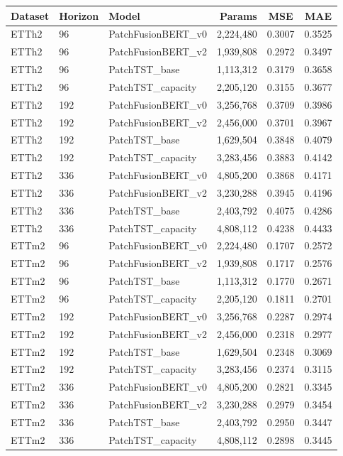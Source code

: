 \begin{tabular}{lllrcc}
\toprule
Dataset & Horizon & Model & Params & MSE & MAE \\
\midrule
ETTh2 & 96 & PatchFusionBERT_v0 & 2,224,480 & 0.3007 & 0.3525 \\
ETTh2 & 96 & PatchFusionBERT_v2 & 1,939,808 & 0.2972 & 0.3497 \\
ETTh2 & 96 & PatchTST_base & 1,113,312 & 0.3179 & 0.3658 \\
ETTh2 & 96 & PatchTST_capacity & 2,205,120 & 0.3155 & 0.3677 \\
ETTh2 & 192 & PatchFusionBERT_v0 & 3,256,768 & 0.3709 & 0.3986 \\
ETTh2 & 192 & PatchFusionBERT_v2 & 2,456,000 & 0.3701 & 0.3967 \\
ETTh2 & 192 & PatchTST_base & 1,629,504 & 0.3848 & 0.4079 \\
ETTh2 & 192 & PatchTST_capacity & 3,283,456 & 0.3883 & 0.4142 \\
ETTh2 & 336 & PatchFusionBERT_v0 & 4,805,200 & 0.3868 & 0.4171 \\
ETTh2 & 336 & PatchFusionBERT_v2 & 3,230,288 & 0.3945 & 0.4196 \\
ETTh2 & 336 & PatchTST_base & 2,403,792 & 0.4075 & 0.4286 \\
ETTh2 & 336 & PatchTST_capacity & 4,808,112 & 0.4238 & 0.4433 \\
ETTm2 & 96 & PatchFusionBERT_v0 & 2,224,480 & 0.1707 & 0.2572 \\
ETTm2 & 96 & PatchFusionBERT_v2 & 1,939,808 & 0.1717 & 0.2576 \\
ETTm2 & 96 & PatchTST_base & 1,113,312 & 0.1770 & 0.2671 \\
ETTm2 & 96 & PatchTST_capacity & 2,205,120 & 0.1811 & 0.2701 \\
ETTm2 & 192 & PatchFusionBERT_v0 & 3,256,768 & 0.2287 & 0.2974 \\
ETTm2 & 192 & PatchFusionBERT_v2 & 2,456,000 & 0.2318 & 0.2977 \\
ETTm2 & 192 & PatchTST_base & 1,629,504 & 0.2348 & 0.3069 \\
ETTm2 & 192 & PatchTST_capacity & 3,283,456 & 0.2374 & 0.3115 \\
ETTm2 & 336 & PatchFusionBERT_v0 & 4,805,200 & 0.2821 & 0.3345 \\
ETTm2 & 336 & PatchFusionBERT_v2 & 3,230,288 & 0.2979 & 0.3454 \\
ETTm2 & 336 & PatchTST_base & 2,403,792 & 0.2950 & 0.3447 \\
ETTm2 & 336 & PatchTST_capacity & 4,808,112 & 0.2898 & 0.3445 \\

\end{tabular}
